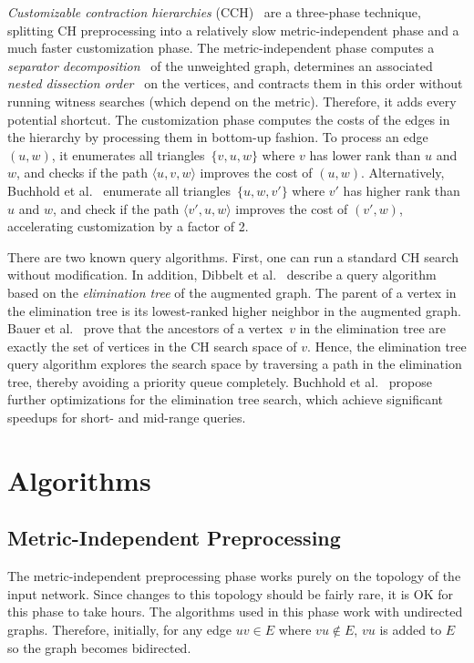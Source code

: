 \documentclass[a4paper, english, cleveref]{lipics-v2021}
\begin{document}
\emph{Customizable contraction hierarchies} (CCH)~\cite{DibbeltSW16} are a three-phase technique, splitting CH preprocessing into a relatively slow metric-independent phase and a much faster customization phase.
The metric-independent phase computes a \emph{separator decomposition}~\cite{BauerCRW16} of the unweighted graph, determines an associated \emph{nested dissection order}~\cite{George73} on the vertices, and contracts them in this order without running witness searches (which depend on the metric).
Therefore, it adds every potential shortcut.
The customization phase computes the costs of the edges in the hierarchy by processing them in bottom-up fashion.
To process an edge~$(u, w)$, it enumerates all triangles~$\{v, u, w\}$ where $v$ has lower rank than $u$ and $w$, and checks if the path $\langle u, v, w \rangle$ improves the cost of $(u, w)$. Alternatively, Buchhold et al.~\cite{BuchholdSW19} enumerate all triangles~$\{u, w, v'\}$ where $v'$ has higher rank than $u$ and $w$, and check if the path $\langle v', u, w \rangle$ improves the cost of $(v', w)$, accelerating customization by a factor of 2.

There are two known query algorithms.
First, one can run a standard CH search without modification.
In addition, Dibbelt et al.~\cite{DibbeltSW16} describe a query algorithm based on the \emph{elimination tree} of the augmented graph.
The parent of a vertex in the elimination tree is its lowest-ranked higher neighbor in the augmented graph.
Bauer et al.~\cite{BauerCRW16} prove that the ancestors of a vertex~$v$ in the elimination tree are exactly the set of vertices in the CH search space of $v$.
Hence, the elimination tree query algorithm explores the search space by traversing a path in the elimination tree, thereby avoiding a priority queue completely.
Buchhold et al.~\cite{BuchholdSW19} propose further optimizations for the elimination tree search, which achieve significant speedups for short- and mid-range queries.

\section{Algorithms}
\subsection{Metric-Independent Preprocessing}

The metric-independent preprocessing phase works purely on the topology of the input network.
Since changes to this topology should be fairly rare, it is OK for this phase to take hours.
The algorithms used in this phase work with undirected graphs.
Therefore, initially, for any edge $uv \in E$ where $vu \notin E$, $vu$ is added to $E$ so the graph becomes bidirected.
\end{document}
